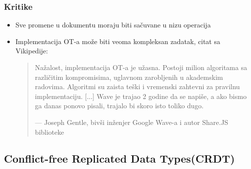 \documentclass[12pt]{article}
\begin{document}
    \subsubsection{Kritike}

    \begin{itemize}
        \item Sve promene u dokumentu moraju biti sačuvane u nizu operacija
        \item Implementacija OT-a može biti veoma kompleksan zadatak, citat sa Vikipedije:

        \begin{quote}
            Nažalost, implementacija OT-a je užasna. Postoji milion algoritama sa različitim kompromisima, uglavnom zarobljenih u akademskim radovima. Algoritmi su zaista teški i vremenski zahtevni za pravilnu implementaciju. [...] Wave je trajao 2 godine da se napiše, a ako bismo ga danas ponovo pisali, trajalo bi skoro isto toliko dugo. 
            \begin{flushright}
            --- Joseph Gentle, bivši inženjer Google Wave-a i autor Share.JS biblioteke
            \end{flushright}
        \end{quote}
        
    \end{itemize}

    \subsection{Conflict-free Replicated Data Types(CRDT)}
    
    
\end{document}
